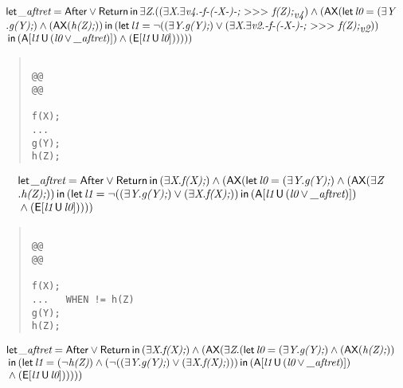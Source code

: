 \documentclass{article}
\newcommand{\U}{\,\mbox{\sf{U}}\,}
\newcommand{\A}{\mbox{\sf{A}}}
\newcommand{\E}{\mbox{\sf{E}}}
\newcommand{\AX}{\mbox{\sf{AX}}}
\newcommand{\mita}[1]{\mbox{\it{{#1}}}}
\newcommand{\msf}[1]{\mbox{\sf{{#1}}}}
\newcommand{\mth}[1]{\({#1}\)}
\begin{document}
\[\begin{array}{l}
\mita{\sf{let}} \, \mita{\_aftret} = \msf{After} \vee \msf{Return} \, \mita{\sf{in}} \, \exists \mita{Z} . ((\exists \mita{X} . \exists \mita{v4} . \mita{-f-(-X-)-;
  \mth{>}\mth{>}\mth{>} f(Z);}_{\mita{v4}}) \wedge (\AX(\mita{\sf{let}} \, \mita{l0} = (\exists \mita{Y}\\\mbox{} . \mita{g(Y);}) \wedge (\AX(\mita{h(Z);})) \, \mita{\sf{in}} \, (\mita{\sf{let}} \, \mita{l1} = \neg ((\exists \mita{Y} . \mita{g(Y);}) \vee (\exists \mita{X} . \exists \mita{v2} . \mita{-f-(-X-)-;
  \mth{>}\mth{>}\mth{>} f(Z);}_{\mita{v2}}))\\\mbox{} \, \mita{\sf{in}} \, (\A[\mita{l1} \U (\mita{l0} \vee \mita{\_aftret})]
) \wedge (\E[\mita{l1} \U \mita{l0}]
)
)
)))

\end{array}\]

\begin{quote}\begin{verbatim}

@@
@@

f(X);
...
g(Y);
h(Z);
\end{verbatim}\end{quote}

\[\begin{array}{l}
\mita{\sf{let}} \, \mita{\_aftret} = \msf{After} \vee \msf{Return} \, \mita{\sf{in}} \, (\exists \mita{X} . \mita{f(X);}) \wedge (\AX(\mita{\sf{let}} \, \mita{l0} = (\exists \mita{Y} . \mita{g(Y);}) \wedge (\AX(\exists \mita{Z}\\\mbox{} . \mita{h(Z);})) \, \mita{\sf{in}} \, (\mita{\sf{let}} \, \mita{l1} = \neg ((\exists \mita{Y} . \mita{g(Y);}) \vee (\exists \mita{X} . \mita{f(X);})) \, \mita{\sf{in}} \, (\A[\mita{l1} \U (\mita{l0} \vee \mita{\_aftret})]
)\\\mbox{} \wedge (\E[\mita{l1} \U \mita{l0}]
)
)
))

\end{array}\]

\begin{quote}\begin{verbatim}

@@
@@

f(X);
...   WHEN != h(Z)
g(Y);
h(Z);
\end{verbatim}\end{quote}

\[\begin{array}{l}
\mita{\sf{let}} \, \mita{\_aftret} = \msf{After} \vee \msf{Return} \, \mita{\sf{in}} \, (\exists \mita{X} . \mita{f(X);}) \wedge (\AX(\exists \mita{Z} . (\mita{\sf{let}} \, \mita{l0} = (\exists \mita{Y} . \mita{g(Y);}) \wedge (\AX(\mita{h(Z);}))\\\mbox{} \, \mita{\sf{in}} \, (\mita{\sf{let}} \, \mita{l1} = (\neg \mita{h(Z)}) \wedge (\neg ((\exists \mita{Y} . \mita{g(Y);}) \vee (\exists \mita{X} . \mita{f(X);}))) \, \mita{\sf{in}} \, (\A[\mita{l1} \U (\mita{l0} \vee \mita{\_aftret})]
)\\\mbox{} \wedge (\E[\mita{l1} \U \mita{l0}]
)
)
)))

\end{array}\]
\end{document}
